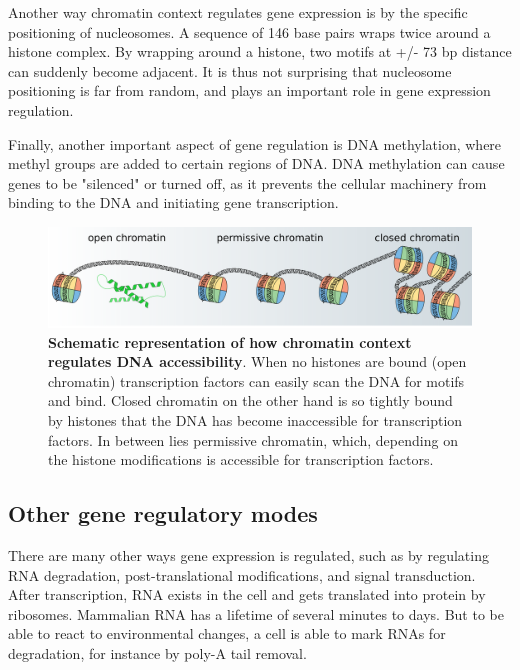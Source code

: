 Another way chromatin context regulates gene expression is by the specific positioning of nucleosomes. A sequence of 146 base pairs wraps twice around a histone complex. By wrapping around a histone, two motifs at +/- 73 bp distance can suddenly become adjacent. It is thus not surprising that nucleosome positioning is far from random, and plays an important role in gene expression regulation\cite{Jiang2009}.

Finally, another important aspect of gene regulation is DNA methylation, where methyl groups are added to certain regions of DNA. DNA methylation can cause genes to be "silenced" or turned off, as it prevents the cellular machinery from binding to the DNA and initiating gene transcription\cite{Moore2012,Greenberg2019}.

\begin{figure}
    \includegraphics[width=\linewidth]{ch.introduction/imgs/accessibility_horizontal.png}
    \caption{\textbf{Schematic representation of how chromatin context regulates DNA accessibility}. When no histones are bound (open chromatin) transcription factors can easily scan the DNA for motifs and bind. Closed chromatin on the other hand is so tightly bound by histones that the DNA has become inaccessible for transcription factors. In between lies permissive chromatin, which, depending on the histone modifications is accessible for transcription factors.}
    \label{fig:accessibility}
\end{figure}

\subsection{Other gene regulatory modes}

There are many other ways gene expression is regulated, such as by regulating RNA degradation, post-translational modifications, and signal transduction. After transcription, RNA exists in the cell and gets translated into protein by ribosomes. Mammalian RNA has a lifetime of several minutes to days\cite{Yu2001}. But to be able to react to environmental changes, a cell is able to mark RNAs for degradation, for instance by poly-A tail removal. 

